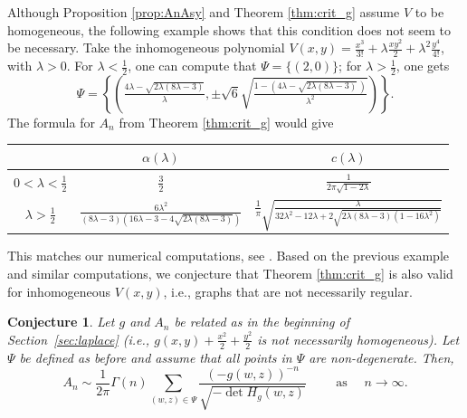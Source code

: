 \documentclass[english]{ourlematemasingle}
\numberwithin{theorem}{section}
\newtheorem{conjecture}[theorem]{Conjecture}
\theoremstyle{remark}
\newenvironment{example}
{\pushQED{\qed}\renewcommand{\qedsymbol}{$\diamond$}\examplex}
{\popQED\endexamplex}
\begin{document}
Although Proposition \ref{prop:AnAsy} and Theorem \ref{thm:crit_g} assume $V$ to be homogeneous, the following example shows that this condition does not seem to be necessary. 
\begin{example}\label{ex:inhomogeneous}
    Take the inhomogeneous polynomial $V(x,y) = \frac{x^3}{3!} + \lambda \frac{x y^2}{2} + \lambda^2 \frac{y^4}{4!}$, with $\lambda>0$. 
    For $\lambda<\frac{1}{2}$, one can compute that $\Psi = \{(2,0)\}$; 
    for $\lambda>\frac{1}{2}$, one gets
    \[
        \Psi = \left\lbrace \left( \tfrac{4 \lambda-\sqrt{2\lambda(8 \lambda-3)}}{\lambda}, \pm \sqrt{6} \sqrt{\tfrac{1 - (4 \lambda-\sqrt{2\lambda(8 \lambda-3)}\,)}{\lambda^{2}}}\right) \right\rbrace.
    \]
    The formula for $A_n$ from Theorem \ref{thm:crit_g} would give 
    \begin{center}
    {\def\arraystretch{1.8}
    \begin{tabular}{c|c|c}
         & $\alpha(\lambda)$ & $c(\lambda)$ \\
        \hline
       $0<\lambda<\tfrac{1}{2}$  & $\frac{3}{2}$ & $\frac{1}{2\pi \sqrt{1-2\lambda}}$ \\
       $\lambda>\frac{1}{2}$  & $\frac{6 \lambda^2}{(8 \lambda-3) \left(16 \lambda-3 -4 \sqrt{2\lambda (8 \lambda-3)}\right)}$ & $\frac{1}{\pi} \sqrt{\frac{\lambda}{32 \lambda^2-12\lambda +2 \sqrt{2 \lambda (8 \lambda-3)(1 - 16 \lambda^2)}}}$ \\
    \end{tabular}
    }
\end{center}
This matches our numerical computations, see \cite{mathrepo}.
\end{example}
Based on the previous example and similar computations, we conjecture that Theorem \ref{thm:crit_g} is also valid for inhomogeneous $V(x,y)$, i.e., graphs that are not necessarily regular. 
\begin{conjecture}
    Let $g$ and $A_n$ be related as in the beginning of Section~\ref{sec:laplace}
    (i.e., $g(x,y)+\frac{x^2}{2} +\frac{y^2}{2}$ is not necessarily homogeneous). Let $\Psi$ be defined as before and assume that all points in $\Psi$ are non-degenerate. Then, 
    $$
    A_n \sim 
    \frac{1}{2\pi}
    \Gamma(n)
    \sum\limits_{(w,z) \in \Psi} \frac{(-g(w,z))^{-n}}{\sqrt{-\det H_g(w,z)}}
    \qquad \text{ as } \quad n \rightarrow \infty.
    $$
\end{conjecture}




\end{document}
